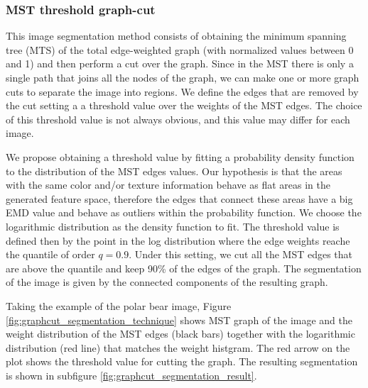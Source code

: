 \subsubsection{MST threshold graph-cut}

This image segmentation method consists of obtaining the minimum spanning tree (MTS) of the total edge-weighted graph (with normalized values between 0 and 1) and then perform a cut over the graph. Since in the MST there is only a single path that joins all the nodes of the graph, we can make one or more graph cuts to separate the image into regions. We define the edges that are removed by the cut setting a a threshold value over the weights of the MST edges. The choice of this threshold value is not always obvious, and this value may differ for each image.

We propose obtaining a threshold value by fitting a probability density function to the distribution of the MST edges values. Our hypothesis is that the areas with the same color and/or texture information behave as flat areas in the generated feature space, therefore the edges that connect these areas have a big EMD value and behave as outliers within the probability function. We choose the logarithmic distribution as the density function to fit. The threshold value is defined then by the point in the log distribution where the edge weights reache the quantile of order $q = 0.9$. Under this setting, we cut all the MST edges that are above the quantile and keep 90\% of the edges of the graph. The segmentation of the image is given by the connected components of the resulting graph.

Taking the example of the polar bear image, Figure \ref{fig:graphcut_segmentation_technique}  shows MST graph of the image and the weight distribution of the MST edges (black bars) together with the logarithmic distribution (red line) that matches the weight histgram. The red arrow on the plot shows the threshold value for cutting the graph. The resulting segmentation is shown in subfigure \ref{fig:graphcut_segmentation_result}.

